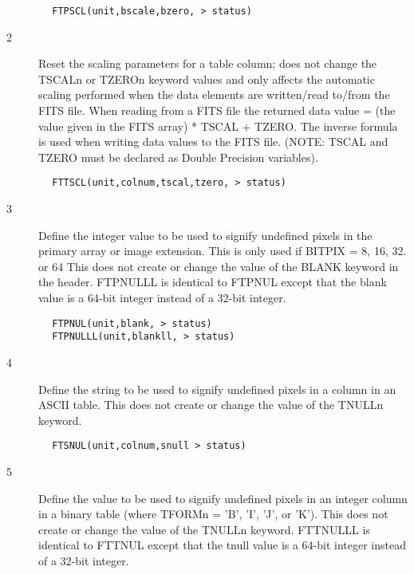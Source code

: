 \documentclass[11pt]{book}
\begin{document}
\begin{verbatim}
        FTPSCL(unit,bscale,bzero, > status)
\end{verbatim}

\begin{description}
\item[2 ] Reset the scaling parameters for a table column; does not change
    the TSCALn or TZEROn keyword values and only affects the automatic
    scaling performed when the data elements are written/read to/from
    the FITS file.  When reading from a FITS file the returned data
    value = (the value given in the FITS array) * TSCAL + TZERO.  The
    inverse formula is used when writing data values to the FITS file.
    (NOTE: TSCAL and TZERO  must be declared as Double Precision
   variables).
\end{description}

\begin{verbatim}
        FTTSCL(unit,colnum,tscal,tzero, > status)
\end{verbatim}

\begin{description}
\item[3 ] Define the integer value to be used to signify undefined pixels in the
    primary array or image extension.  This is only used if BITPIX = 8, 16,
    32. or 64  This does not create or change the value of the BLANK keyword in
    the header. FTPNULLL is identical to FTPNUL except that the blank
   value is a 64-bit integer instead of a 32-bit integer.
\end{description}

\begin{verbatim}
        FTPNUL(unit,blank, > status)
        FTPNULLL(unit,blankll, > status)
\end{verbatim}

\begin{description}
\item[4 ] Define the string to be used to signify undefined pixels in
    a column in an ASCII table.  This does not create or change the value
   of the TNULLn keyword.
\end{description}

\begin{verbatim}
        FTSNUL(unit,colnum,snull > status)
\end{verbatim}

\begin{description}
\item[5 ] Define the value to be used to signify undefined pixels in
    an integer column in a binary table (where TFORMn = 'B', 'I', 'J', or 'K').
    This does not create or  change the value of the TNULLn keyword.
    FTTNULLL is identical to FTTNUL except that the tnull
   value is a 64-bit integer instead of a 32-bit integer.
\end{description}
\end{document}
